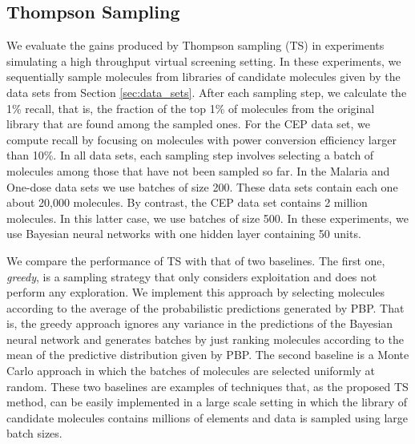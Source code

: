 \subsection{Thompson Sampling}

We evaluate the gains produced by Thompson sampling (TS) in experiments simulating a high throughput virtual screening setting. In these experiments, we sequentially sample molecules from libraries of candidate molecules given by the data sets from Section \ref{sec:data_sets}. After each sampling step, we calculate the 1\% recall, that is, the fraction of the top 1\% of molecules from the original library that are found among the sampled ones. For the CEP data set, we compute recall by focusing on molecules with power conversion efficiency larger than 10\%. In all data sets, each sampling step involves selecting a batch of molecules among those that have not been sampled so far. In the Malaria and One-dose data sets we use batches of size 200. These data sets contain each one about 20,000 molecules. By contrast, the CEP data set contains 2 million molecules. In this latter case, we use batches of size 500. In these experiments, we use Bayesian neural networks with one hidden layer containing 50 units.

We compare the performance of TS with that of two baselines. The first one, \emph{greedy}, is a sampling strategy that only considers exploitation and does not perform any exploration. We implement this approach by selecting molecules according to the average of the probabilistic predictions generated by PBP. That is, the greedy approach ignores any variance in the predictions of the Bayesian neural network and generates batches by just ranking molecules according to the mean of the predictive distribution given by PBP. The second baseline is a Monte Carlo approach in which the batches of molecules are selected uniformly at random. These two baselines are examples of techniques that, as the proposed TS method, can be easily implemented in a large scale setting in which the library of candidate molecules contains millions of elements and data is sampled using large batch sizes.


